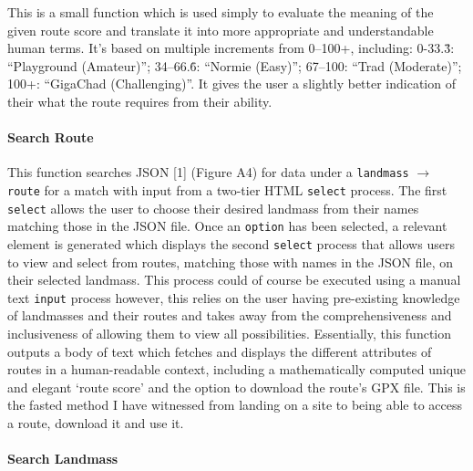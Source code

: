 \documentclass[11pt, english]{article}
\begin{document}
	This is a small function which is used simply to evaluate the meaning of the given route score and translate it into more appropriate and understandable human terms. It's based on multiple increments from 0--100+, including: 0-33.\.{3}: ``Playground (Amateur)''; 34--66.\.{6}: ``Normie (Easy)''; 67--100: ``Trad (Moderate)''; 100+: ``GigaChad (Challenging)''. It gives the user a slightly better indication of their what the route requires from their ability.

			\paragraph{Search Route}

	This function searches JSON [1] (Figure A4) for data under a \texttt{landmass} $\rightarrow$ \texttt{route} for a match with input from a two-tier HTML \texttt{select} process. The first \texttt{select} allows the user to choose their desired landmass from their names matching those in the JSON file. Once an \texttt{option} has been selected, a relevant element is generated which displays the second \texttt{select} process that allows users to view and select from routes, matching those with names in the JSON file, on their selected landmass. This process could of course be executed using a manual text \texttt{input} process however, this relies on the user having pre-existing knowledge of landmasses and their routes and takes away from the comprehensiveness and inclusiveness of allowing them to view all possibilities. Essentially, this function outputs a body of text which fetches and displays the different attributes of routes in a human-readable context, including a mathematically computed unique and elegant `route score' and the option to download the route's GPX file. This is the fasted method I have witnessed from landing on a site to being able to access a route, download it and use it.

			\paragraph{Search Landmass}
\end{document}

